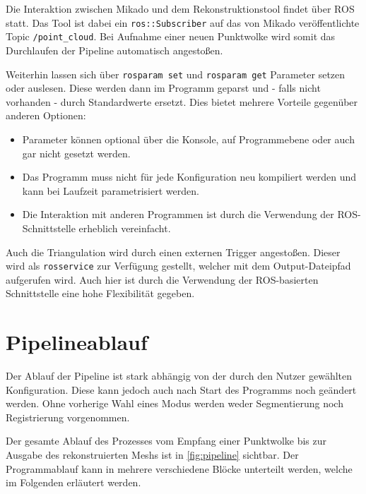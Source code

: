 Die Interaktion zwischen Mikado und dem Rekonstruktionstool findet über \ac{ROS} statt.
Das Tool ist dabei ein \texttt{ros::Subscriber} auf das von Mikado veröffentlichte Topic \texttt{/point\_cloud}.
Bei Aufnahme einer neuen Punktwolke wird somit das Durchlaufen der Pipeline automatisch angestoßen.

Weiterhin lassen sich über \texttt{rosparam set} und \texttt{rosparam get} Parameter setzen oder auslesen.
Diese werden dann im Programm geparst und - falls nicht vorhanden - durch Standardwerte ersetzt.
Dies bietet mehrere Vorteile gegenüber anderen Optionen:

\begin{itemize}
\item Parameter können optional über die Konsole, auf Programmebene oder auch gar nicht gesetzt werden.
\item Das Programm muss nicht für jede Konfiguration neu kompiliert werden und kann bei Laufzeit parametrisiert werden.
\item Die Interaktion mit anderen Programmen ist durch die Verwendung der \ac{ROS}-Schnittstelle erheblich vereinfacht.
\end{itemize}

Auch die Triangulation wird durch einen externen Trigger angestoßen.
Dieser wird als \texttt{rosservice} zur Verfügung gestellt, welcher mit dem Output-Dateipfad aufgerufen wird.
Auch hier ist durch die Verwendung der \ac{ROS}-basierten Schnittstelle eine hohe Flexibilität gegeben.



\section{Pipelineablauf}
\label{sec:pipeline}

Der Ablauf der Pipeline ist stark abhängig von der durch den Nutzer gewählten Konfiguration.
Diese kann jedoch auch nach Start des Programms noch geändert werden.
Ohne vorherige Wahl eines Modus werden weder Segmentierung noch Registrierung vorgenommen.

Der gesamte Ablauf des Prozesses vom Empfang einer Punktwolke bis zur Ausgabe des rekonstruierten Meshs ist in \autoref{fig:pipeline} sichtbar.
Der Programmablauf kann in mehrere verschiedene Blöcke unterteilt werden, welche im Folgenden erläutert werden.

